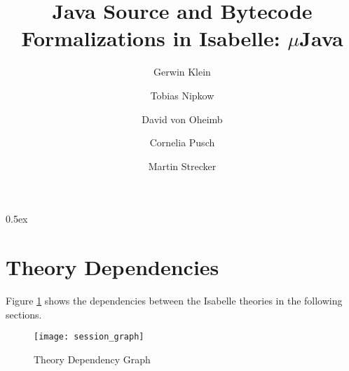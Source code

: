 \documentclass[11pt,a4paper]{book}
\newcommand{\mJava}{$\mu$Java}
\begin{document}
\title{Java Source and Bytecode Formalizations in Isabelle: \mJava}
\author{Gerwin Klein \and Tobias Nipkow \and David von Oheimb \and
  \and Cornelia Pusch \and Martin Strecker}
\maketitle


\tableofcontents
\parindent 0pt \parskip 0.5ex



\section{Theory Dependencies}

Figure \ref{theory-deps} shows the dependencies between 
the Isabelle theories in the following sections.

\begin{figure}[h!t]
\begin{center}
  \texttt{[image: session\_graph]}
\end{center}
\caption{Theory Dependency Graph\label{theory-deps}}
\end{figure}

\newpage


\newpage
\nocite{*}


\end{document}
